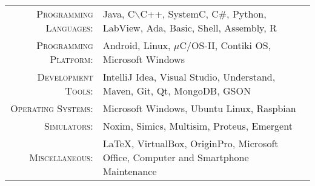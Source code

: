 %
%
%

\renewcommand{\arraystretch}{1.1}

	\begin{tabular}{>{}r>{}p{13cm}} 
		\textsc{Programming Languages:}  		&   Java, C$\backslash$C++, SystemC, C\#, Python, LabView, Ada, Basic, Shell, Assembly, R\\ 
		\textsc{Programming Platform:}               	& Android, Linux, $\mu$C/OS-II, Contiki OS, Microsoft Windows\\ 
		\textsc{Development Tools:}	  		&   IntelliJ Idea, Visual Studio, Understand, Maven, Git, Qt, MongoDB, GSON\\
		\textsc{Operating Systems:}	        &   Microsoft Windows, Ubuntu Linux, Raspbian\\ 
        \textsc{Simulators:}				&   Noxim, Simics, Multisim, Proteus, Emergent\\
        \textsc{Miscellaneous:}				&   \LaTeX, VirtualBox, OriginPro, Microsoft Office, Computer and Smartphone Maintenance\\
	\end{tabular}